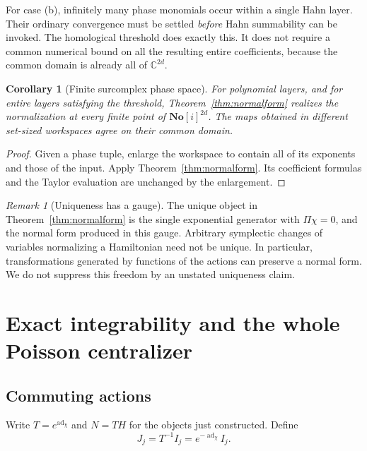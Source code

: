 \documentclass[11pt,letterpaper]{article}
\numberwithin{equation}{section}
\newtheorem{corollary}[theorem]{Corollary}
\theoremstyle{definition}
\theoremstyle{remark}
\newtheorem{remark}[theorem]{Remark}
\newcommand{\C}{\mathbb C}
\newcommand{\No}{\mathbf{No}}
\newcommand{\ad}{\operatorname{ad}}
\begin{document}
For case (b), infinitely many phase monomials occur within a single Hahn
layer. Their ordinary convergence must be settled \emph{before} Hahn
summability can be invoked. The homological threshold does exactly this.
It does not require a common numerical bound on all the resulting entire
coefficients, because the common domain is already all of $\C^{2d}$.

\begin{corollary}[Finite surcomplex phase space]\label{cor:surcomplex}
For polynomial layers, and for entire layers satisfying the threshold,
Theorem~\ref{thm:normalform} realizes the normalization at every finite
point of $\No[i]^{2d}$. The maps obtained in different set-sized workspaces
agree on their common domain.
\end{corollary}
\begin{proof}
Given a phase tuple, enlarge the workspace to contain all of its exponents
and those of the input. Apply Theorem~\ref{thm:normalform}. Its coefficient
formulas and the Taylor evaluation are unchanged by the enlargement.
\end{proof}

\begin{remark}[Uniqueness has a gauge]
The unique object in Theorem~\ref{thm:normalform} is the single exponential
generator with $\Pi\chi=0$, and the normal form produced in this gauge.
Arbitrary symplectic changes of variables normalizing a Hamiltonian need not
be unique. In particular, transformations generated by functions of the
actions can preserve a normal form. We do not suppress this freedom by an
unstated uniqueness claim.
\end{remark}

\section{Exact integrability and the whole Poisson centralizer}
\label{sec:integrability}

\subsection{Commuting actions}
Write $T=e^{\ad_\chi}$ and $N=TH$ for the objects just constructed. Define
\begin{equation}\label{eq:actionsJ}
 J_j=T^{-1}I_j=e^{-\ad_\chi}I_j.
\end{equation}
\end{document}
